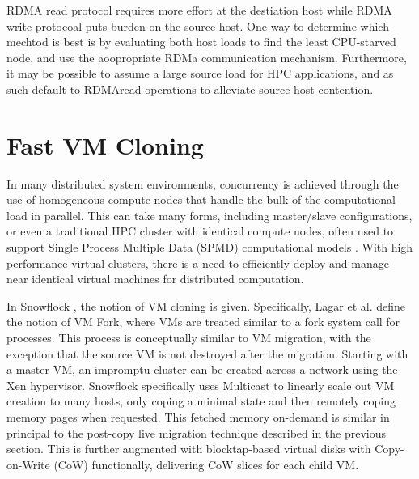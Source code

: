 
%
%


RDMA read protocol requires more effort at the destiation host while RDMA write protocoal puts burden on the source host.  One way to determine which mechtod is best is by evaluating both host loads to find the least CPU-starved node, and use the aoopropriate RDMa communication mechanism. Furthermore, it may be possible to assume a large source load for HPC applications, and as such default to RDMAread operations to alleviate source host contention. 






\section{Fast VM Cloning}
\label{vmcloning}

In many distributed system environments, concurrency is achieved through the use of homogeneous compute nodes that handle the bulk of the computational load in parallel. This can take many forms, including master/slave configurations, or even a traditional HPC cluster with identical compute nodes, often used to support Single Process Multiple Data (SPMD) computational models \cite{spmd1988}. With high performance virtual clusters, there is a need to efficiently deploy and manage near identical virtual machines for distributed computation. 

In Snowflock \cite{lagar2009snowflock, lagar2011snowflock}, the notion of VM cloning is given. Specifically, Lagar et al. define the notion of VM Fork, where VMs are treated similar to a fork\(\) system call for processes.   This process is conceptually similar to VM migration, with the exception that the source VM is not destroyed after the migration. Starting with a master VM, an impromptu cluster can be created across a network using the Xen hypervisor.  Snowflock specifically uses Multicast to linearly scale out VM creation to many hosts, only coping a minimal state and then remotely coping memory pages when requested.  This fetched memory on-demand is similar in principal to the post-copy live migration technique described in the previous section.  This is further augmented with blocktap-based virtual disks with Copy-on-Write (CoW) functionally, delivering CoW slices for each child VM. 

